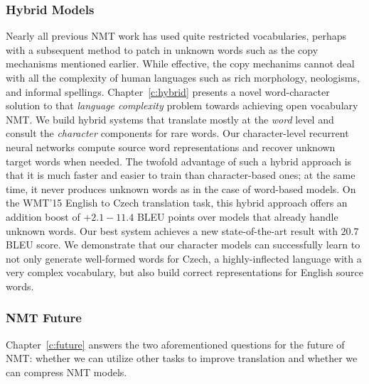 \subsubsection{Hybrid Models} 
Nearly all previous NMT work has used quite restricted
vocabularies, perhaps with a subsequent method to patch in unknown words such as
the copy mechanisms mentioned earlier. While effective, the copy mechanims cannot deal with all the
complexity of human languages such as rich morphology, neologisms, and informal
spellings.
Chapter~\ref{c:hybrid} presents a novel word-character solution to that {\it
language complexity} problem towards achieving
open vocabulary NMT.
We build hybrid systems that translate mostly at the {\it word}
level and consult the {\it character} components for rare words. 
Our character-level recurrent neural networks compute source
word representations and recover unknown target words when needed.
The twofold advantage of such a hybrid approach is that it is much faster and easier to
train than character-based ones; at the same time, it never produces unknown words as in the case of word-based models. 
On the WMT'15 English to Czech translation task, 
this hybrid approach offers an addition boost of +$2.1{-}11.4$ BLEU points over models 
that already handle unknown words. 
Our best system achieves a new state-of-the-art result with
$20.7$ BLEU score.
We demonstrate that our character models can successfully learn to not only generate well-formed words for Czech, a
highly-inflected language with a very complex vocabulary, but also build correct
representations for English source words.

\subsubsection{NMT Future} 
Chapter~\ref{c:future} answers the two aforementioned questions
for the future of NMT: whether we can utilize other tasks to improve
translation and whether we can compress NMT models.

